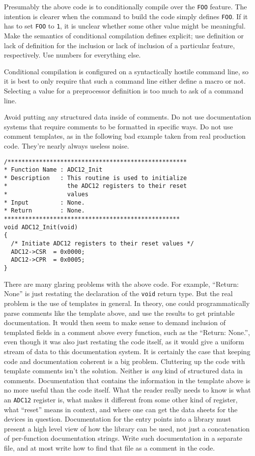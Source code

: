 \documentclass{lulu}
\newcommand{\code}[1]{\texttt{#1}\xspace}
\begin{document}
Presumably the above code is to conditionally compile over the
\code{FOO} feature.  The intention is clearer when the command to
build the code simply defines \code{FOO}.  If it has to set \code{FOO}
to \code{1}, it is unclear whether some other value might be
meaningful.  Make the semantics of conditional compilation defines
explicit; use definition or lack of definition for the inclusion or
lack of inclusion of a particular feature, respectively.  Use numbers
for everything else.

Conditional compilation is configured on a syntactically hostile
command line, so it is best to only require that such a command line
either define a macro or not.  Selecting a value for a preprocessor
definition is too much to ask of a command line.

Avoid putting any structured data inside of comments.  Do not use
documentation systems that require comments to be formatted in
specific ways.  Do not use comment templates, as in the following bad
example taken from real production code.  They're nearly always
useless noise.

\begin{verbatim}
/***************************************************
* Function Name : ADC12_Init
* Description   : This routine is used to initialize
*                 the ADC12 registers to their reset 
*                 values
* Input         : None.
* Return        : None.
**************************************************
void ADC12_Init(void)
{
  /* Initiate ADC12 registers to their reset values */
  ADC12->CSR  = 0x0000;
  ADC12->CPR  = 0x0005;
}
\end{verbatim}

There are many glaring problems with the above code.  For example,
``Return: None'' is just restating the declaration of the \code{void}
return type.  But the real problem is the use of templates in general.
In theory, one could programmatically parse comments like the template
above, and use the results to get printable documentation.  It would
then seem to make sense to demand inclusion of templated fields in a
comment above every function, such as the ``Return: None.'', even
though it was also just restating the code itself, as it would give a
uniform stream of data to this documentation system.  It is certainly
the case that keeping code and documentation coherent is a big
problem.  Cluttering up the code with template comments isn't the
solution.  Neither is \emph{any} kind of structured data in comments.
Documentation that contains the information in the template above is
no more useful than the code itself.  What the reader really needs to
know is what an \code{ADC12} register is, what makes it different from
some other kind of register, what ``reset'' means in context, and
where one can get the data sheets for the devices in question.
Documentation for the entry points into a library must present a high
level view of how the library can be used, not just a concatenation of
per-function documentation strings.  Write such documentation in a
separate file, and at most write how to find that file as a comment in
the code.
\end{document}
